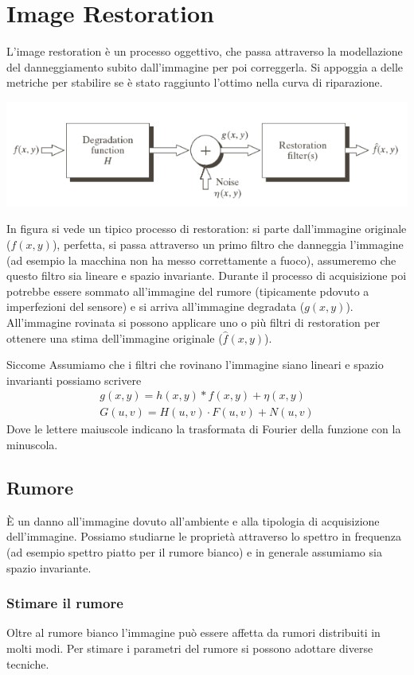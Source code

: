 \chapter{Image Restoration}
L'image restoration è un processo oggettivo, che passa attraverso la modellazione del danneggiamento subito dall'immagine per poi correggerla. Si appoggia a delle metriche per stabilire se è stato raggiunto l'ottimo nella curva di riparazione.

\begin{center}
	\includegraphics[width=.7\linewidth]{Picture/Restoration_Process}
\end{center}
In figura si vede un tipico processo di restoration: si parte dall'immagine originale ($f(x,y)$), perfetta, si passa attraverso un primo filtro che danneggia l'immagine (ad esempio la macchina non ha messo correttamente a fuoco), assumeremo che questo filtro sia lineare e spazio invariante. Durante il processo di acquisizione poi potrebbe essere sommato all'immagine del rumore (tipicamente pdovuto a imperfezioni del sensore) e si arriva all'immagine degradata ($g(x,y)$). All'immagine rovinata si possono applicare uno o più filtri di restoration per ottenere una stima dell'immagine originale ($\hat{f}(x,y)$).

Siccome Assumiamo che i filtri che rovinano l'immagine siano lineari e spazio invarianti possiamo scrivere 
\begin{gather}
	g(x,y) = h(x,y)*f(x,y) + \eta(x,y)\\
	G(u,v) = H(u,v)\cdot F(u,v) + N(u,v)
\end{gather}
Dove le lettere maiuscole indicano la trasformata di Fourier della funzione con la minuscola.

\section{Rumore}
È un danno all'immagine dovuto all'ambiente e alla tipologia di acquisizione dell'immagine. Possiamo studiarne le proprietà attraverso lo spettro in frequenza (ad esempio spettro piatto per il rumore bianco) e in generale assumiamo sia spazio invariante.

\subsection{Stimare il rumore}
Oltre al rumore bianco l'immagine può essere affetta da rumori distribuiti in molti modi. Per stimare i parametri del rumore si possono adottare diverse tecniche.
